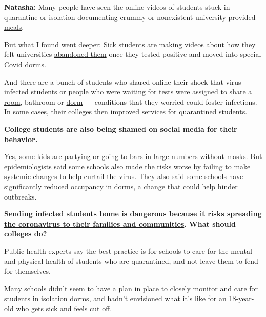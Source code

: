 \textbf{Natasha:} Many people have seen the online videos of students
stuck in quarantine or isolation documenting
\href{https://www.nytimes3xbfgragh.onion/2020/08/22/nyregion/coronavirus-tiktok-college-quarantine-food.html}{crummy
or nonexistent university-provided meals}.

But what I found went deeper: Sick students are making videos about how
they felt universities
\href{https://dailyiowan.com/2020/08/20/i-felt-like-a-guinea-pig-students-awful-quarantine-experience-prompts-university-of-iowa-apology/}{abandoned
them} once they tested positive and moved into special Covid dorms.

And there are a bunch of students who shared online their shock that
virus-infected students or people who were waiting for tests were
\href{https://twitter.com/volkporter/status/1295899925209899009}{assigned
to share a room}, bathroom or
\href{https://twitter.com/sarahortbal/status/1298099716127895553}{dorm}
--- conditions that they worried could foster infections. In some cases,
their colleges then improved services for quarantined students.

\textbf{College students are also being shamed on social media for their
behavior.}

Yes, some kids are
\href{https://www.nbcnews.com/news/us-news/more-20-nyu-students-suspended-breaking-coronavirus-rules-school-says-n1239443}{partying}
or
\href{https://www.al.com/news/2020/08/this-has-to-become-a-cause-careless-partying-at-ua-leads-to-campus-restrictions.html}{going
to bars in large numbers without masks}. But epidemiologists said some
schools also made the risks worse by failing to make systemic changes to
help curtail the virus. They also said some schools have significantly
reduced occupancy in dorms, a change that could help hinder outbreaks.

\textbf{Sending infected students home is dangerous because it}
\textbf{\href{https://www.nytimes3xbfgragh.onion/2020/09/09/briefing/astrazeneca-california-wildfires-justice-department-your-wednesday-briefing.html}{risks
spreading the coronavirus to their families and communities}. What
should colleges do?}

Public health experts say the best practice is for schools to care for
the mental and physical health of students who are quarantined, and not
leave them to fend for themselves.

Many schools didn't seem to have a plan in place to closely monitor and
care for students in isolation dorms, and hadn't envisioned what it's
like for an 18-year-old who gets sick and feels cut off.

